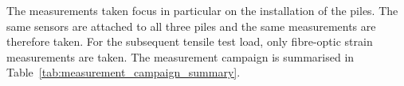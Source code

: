 {{{{The measurements taken focus in particular on the installation of the piles. The same sensors are attached to all three piles and the same measurements are therefore taken. For the subsequent tensile test load, only fibre-optic strain measurements are taken. The measurement campaign is summarised in Table~\ref{tab:measurement_campaign_summary}.
%


}}}}
